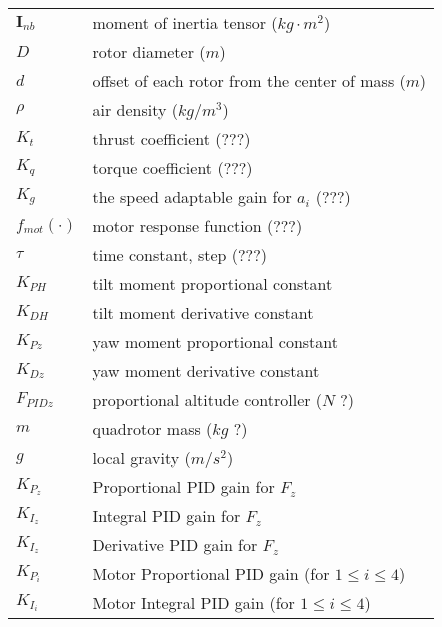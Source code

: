 \documentclass{article}
\numberwithin{equation}{section} %
\newcommand{\bs}[1]{\boldsymbol{#1}}
\begin{document}
\begin{tabular}{l l}
 	$ \bs{I}_{nb} $			& moment of inertia tensor ($kg \cdot m^{2}$) \\
 	$ D $ 					& rotor diameter ($m$) \\
 	$ d $					& offset of each rotor from the center of mass ($m$) \\
 	$ \rho $				& air density ($kg/m^3$) \\
 	$ K_t $					& thrust coefficient ($???$) \\
 	$ K_q $					& torque coefficient ($???$) \\
 	$ K_g $					& the speed adaptable gain for $a_i$ ($???$) \\
 	$ f_{mot}( \cdot ) $	& motor response function ($???$) \\
 	$ \tau $				& time constant, step ($???$) \\
 	$K_{PH} $				& tilt moment proportional constant \\
 	$K_{DH} $				& tilt moment derivative constant \\
 	$K_{Pz} $				& yaw moment proportional constant \\
 	$K_{Dz} $				& yaw moment derivative constant \\
 	$F_{PIDz} $				& proportional altitude controller ($N$ ?) \\
 	$m$						& quadrotor mass ($kg$ ?) \\
 	$g$						& local gravity ($m/s^2$) \\
 	$K_{P_z}$				& Proportional PID gain for $F_z$ \\
	$K_{I_z}$				& Integral PID gain for $F_z$ \\
	$K_{I_z}$				& Derivative PID gain for $F_z$ \\
 	$ K_{P_i} $				& Motor Proportional PID gain (for $1 \leq i \leq 4$) \\
 	$ K_{I_i} $				& Motor Integral PID gain (for $1 \leq i \leq 4$) \\
 	
\end{tabular}

\end{document}
